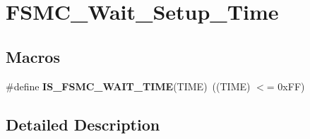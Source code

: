 \hypertarget{group___f_s_m_c___wait___setup___time}{}\section{F\+S\+M\+C\+\_\+\+Wait\+\_\+\+Setup\+\_\+\+Time}
\label{group___f_s_m_c___wait___setup___time}
\subsection*{Macros}
\begin{DoxyCompactItemize}
\item 
\hypertarget{group___f_s_m_c___wait___setup___time_ga5c0efc48afb916ceff32868940f81613}{}\#define {\bfseries I\+S\+\_\+\+F\+S\+M\+C\+\_\+\+W\+A\+I\+T\+\_\+\+T\+I\+M\+E}(T\+I\+M\+E)~((T\+I\+M\+E) $<$= 0x\+F\+F)\label{group___f_s_m_c___wait___setup___time_ga5c0efc48afb916ceff32868940f81613}

\end{DoxyCompactItemize}


\subsection{Detailed Description}
